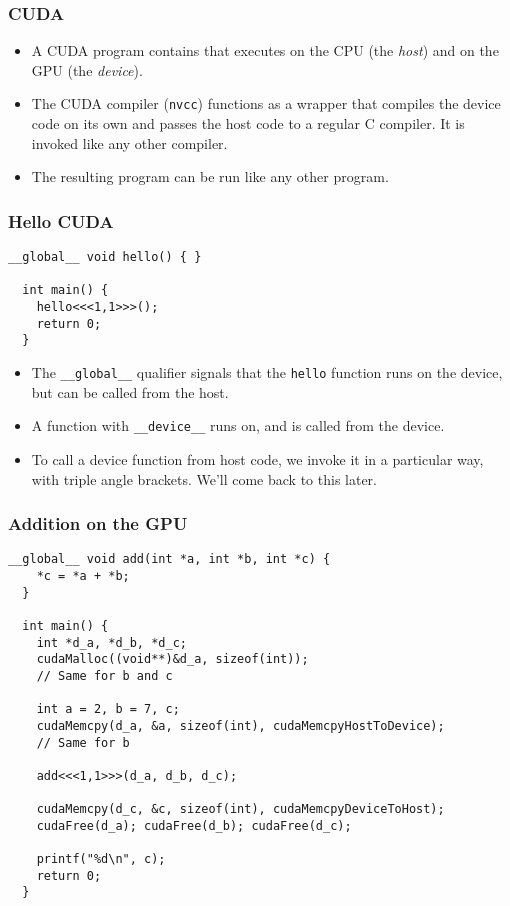 \begin{frame}[fragile]
  \frametitle{CUDA}
  \begin{itemize}
  \item A CUDA program contains that executes on the CPU (the \emph{host}) and
    on the GPU (the \emph{device}).
  \item The CUDA compiler (\texttt{nvcc}) functions as a wrapper that compiles
    the device code on its own and passes the host code to a regular C compiler.
    It is invoked like any other compiler.
  \item The resulting program can be run like any other program.
  \end{itemize}
\end{frame}

\begin{frame}[fragile]
  \frametitle{Hello CUDA}
  \begin{lstlisting}[style=cuda]
  __global__ void hello() { }

  int main() {
    hello<<<1,1>>>();
    return 0;
  }
  \end{lstlisting}
  \begin{itemize}
  \item The \texttt{\_\_global\_\_} qualifier signals that the \texttt{hello}
    function runs on the device, but can be called from the host.
  \item A function with \texttt{\_\_device\_\_} runs on, and is called from the
    device.
  \item To call a device function from host code, we invoke it in a particular
    way, with triple angle brackets. We'll come back to this later.
  \end{itemize}
\end{frame}

\begin{frame}[fragile]
  \frametitle{Addition on the GPU}
  \begin{lstlisting}[style=cuda, basicstyle=\ttfamily\scriptsize]
  __global__ void add(int *a, int *b, int *c) {
    *c = *a + *b;
  }

  int main() {
    int *d_a, *d_b, *d_c;
    cudaMalloc((void**)&d_a, sizeof(int));
    // Same for b and c

    int a = 2, b = 7, c;
    cudaMemcpy(d_a, &a, sizeof(int), cudaMemcpyHostToDevice);
    // Same for b

    add<<<1,1>>>(d_a, d_b, d_c);

    cudaMemcpy(d_c, &c, sizeof(int), cudaMemcpyDeviceToHost);
    cudaFree(d_a); cudaFree(d_b); cudaFree(d_c);

    printf("%d\n", c);
    return 0;
  }
  \end{lstlisting}
\end{frame}

